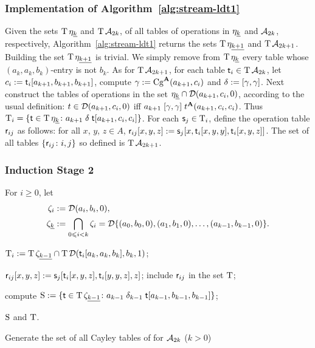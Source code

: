 \subsubsection{Implementation of Algorithm~\ref{alg:stream-ldt1}}
Given the sets $\operatorname{T} \eta_{\underline{k}}$
and $\operatorname{T} \mathcal{A}_{2k}$, of all tables of operations in 
$\eta_{\underline{k}}$ and $\mathcal{A}_{2k}$, respectively,
Algorithm~\ref{alg:stream-ldt1} returns the sets
$\operatorname{T} \eta_{\underline{k+1}}$ and $\operatorname{T} \mathcal{A}_{2k+1}$.
Building the set $\operatorname{T} \eta_{\underline{k+1}}$ is trivial.  We simply remove 
from $\operatorname{T} \eta_{\underline{k}}$ every table whose $(a_k,a_k,b_k)$-entry is not $b_k$.
As for $\operatorname{T} \mathcal{A}_{2k+1}$,
for each table $\mathsf{t}_i \in \operatorname{T} \mathcal{A}_{2k}$,
let 
$c_i:= \mathsf{t}_i[a_{k+1}, b_{k+1}, b_{k+1}]$, compute
$\gamma := \operatorname{Cg}^{\mathbf{A}}(a_{k+1}, c_i)$ and $\delta := [\gamma, \gamma]$. %
Next construct the tables of operations in the set
$\eta_{\underline{k}}\cap \mathcal{D} (a_{k+1}, c_i, 0)$, according to the usual
definition: 
$t \in \mathcal{D} (a_{k+1},c_i,0)$ iff $a_{k+1} \mathrel{[\gamma, \gamma]} t^{\mathbf{A}}(a_{k+1},c_i,c_i)$.
Thus 
$\operatorname{T}_i = \{\mathsf{t} \in \operatorname{T} \eta_{\underline{k}} \colon  a_{k+1} \mathrel{\delta} \mathsf{t} [a_{k+1}, c_i, c_i]\}$.
For each $\mathsf{s}_j \in \operatorname{T}_i$, define the operation table $\mathsf{r}_{ij}$ as follows:
for all $x$, $y$, $z \in A$, $\mathsf{r}_{ij}[x,y,z] :=  \mathsf{s}_j[x, \mathsf{t}_i[x,y,y], \mathsf{t}_i[x,y,z]]$. 
The set of all tables $\{\mathsf{r}_{ij} \colon i, j\}$ so defined is $\operatorname{T} \mathcal{A}_{2k+1}$.



\subsubsection{Induction Stage 2}
For $i\geq 0$, let
\begin{align*}
\zeta_i &:= \mathcal{D} (a_i, b_i, 0), \\
  \zeta_{\underline{k}} &:= \bigcap_{0\leqslant i < k}\zeta_i
  =\mathcal{D} \{(a_0, b_0, 0), (a_1, b_1, 0), \dots, (a_{k-1}, b_{k-1}, 0)\}.
\end{align*}

\begin{algorithm}

   {
  
    $\operatorname{T}_i := \operatorname{T} \zeta_{\underline{k-1}}  \cap \operatorname{T} \mathcal{D} (\mathsf{t}_i[a_k, a_k, b_k], b_k, 1)$;

     {
        {
        $\mathsf{r}_{ij}[x,y,z] :=  \mathsf{s}_{j}[\mathsf{t}_i[x,y,z], \mathsf{t}_i[y,y,z], z]$;
      }
      include $\mathsf{r}_{ij}$ in the set $\operatorname{T}$;
    }
  }

  compute $\operatorname{S} := \{\mathsf{t} \in \operatorname{T} \zeta_{\underline{k-1}} \colon a_{k-1} \mathrel{\delta_{k-1}} \mathsf{t}[a_{k-1},b_{k-1},b_{k-1}]\}$;

  \Return $\operatorname{S}$ and $\operatorname{T}$.

  \caption{Generate the set of all Cayley tables of \ldtos for $\mathcal{A}_{2k}$ \label{alg:stream-ldt2} {\small ($k> 0$)}}
\end{algorithm}




